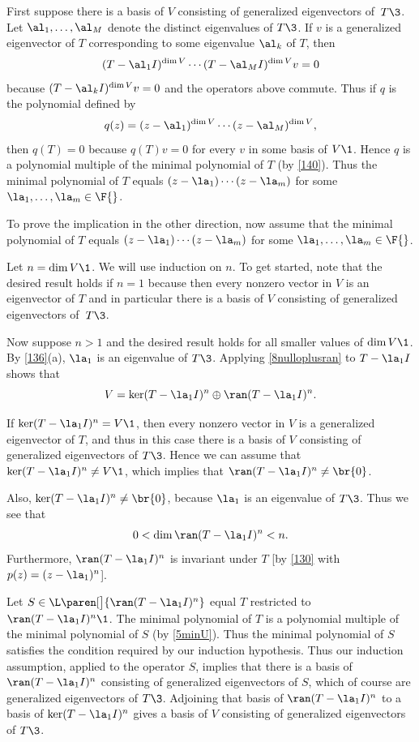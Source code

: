 \begin{Solution}
First suppose there is a basis of $V$ consisting of generalized eigenvectors of~$T\3$. Let $\al_1, \ldots, \al_M$ denote the distinct eigenvalues of $T\3$. If $v$ is a generalized eigenvector of $T$ corresponding to some eigenvalue $\al_k$ of $T$, then
\[
(T - \al_1 I)^{\dim V} \cdots (T - \al_M I)^{\dim V}v = 0
\]
because $(T - \al_k I)^{\dim V}v =0$ and the operators above commute. Thus if $q$ is the polynomial defined by
\[
q(z) = (z - \al_1)^{\dim V} \cdots (z - \al_M)^{\dim V},
\]
then $q(T) = 0$ because $q(T)v = 0$ for every $v$ in some basis of $V\1$. Hence $q$ is a polynomial multiple of the minimal polynomial of $T$ (by \ref{140}). Thus the minimal polynomial of $T$ equals
$(z-\la_1) \cdots (z-\la_m)$ for some $\la_1, \ldots, \la_m \in \F{}$.

To prove the implication in the other direction, now assume that the minimal polynomial of $T$ equals $(z-\la_1) \cdots (z-\la_m)$ for some $\la_1, \ldots, \la_m \in \F{}$.

Let $n = \dim V\1$. We will use induction on $n$. To get started, note that the desired result holds if $n=1$ because then every nonzero vector in $V$ is an eigenvector of $T$ and in particular there is a basis of $V$ consisting of generalized eigenvectors of~$T\3$.

Now suppose $n > 1$ and the desired result holds for all smaller values of $\dim V\1$. By \ref{136}(a), $\la_1$ is an eigenvalue of $T\3$. Applying \ref{8nulloplusran} to $T - \la_1 I$ shows that
\[
V = \ker(T - \la_1 I)^n \oplus \ran (T - \la_1 I)^n.
\]

If $\ker(T - \la_1 I)^n = V\1$, then every nonzero vector in $V$ is a generalized eigenvector of $T$, and thus in this case there is a basis of $V$ consisting of generalized eigenvectors of $T\3$. Hence we can assume that $\ker(T - \la_1 I)^n \ne V\1$, which implies that
$\ran (T - \la_1 I)^n \ne \br{0}$.

Also, $\ker(T - \la_1 I)^n \ne \br{0}$, because $\la_1$ is an eigenvalue of $T\3$. Thus we see that
\[
0 < \dim \ran(T - \la_1 I)^n < n.
\]
Furthermore, $\ran(T - \la_1 I)^n$ is invariant under $T$ [by \ref{130} with $p(z) = (z - \la_1)^n$].

Let $S \in \L\paren[\big]{ \ran(T - \la_1 I)^n }$ equal $T$ restricted to $\ran(T - \la_1 I)^n\1$. The minimal polynomial of $T$ is a polynomial multiple of the minimal polynomial of $S$ (by \ref{5minU}). Thus the minimal polynomial of $S$ satisfies the condition required by our induction hypothesis. Thus our induction assumption, applied to the operator $S$, implies that there is a basis of $\ran(T - \la_1 I)^n$ consisting of generalized eigenvectors of $S$, which of course are generalized eigenvectors of $T\3$. Adjoining that basis of
$\ran(T - \la_1 I)^n$ to a basis of $\ker(T - \la_1 I)^n$ gives a basis of $V$ consisting of generalized eigenvectors of $T\3$.
\end{Solution}

